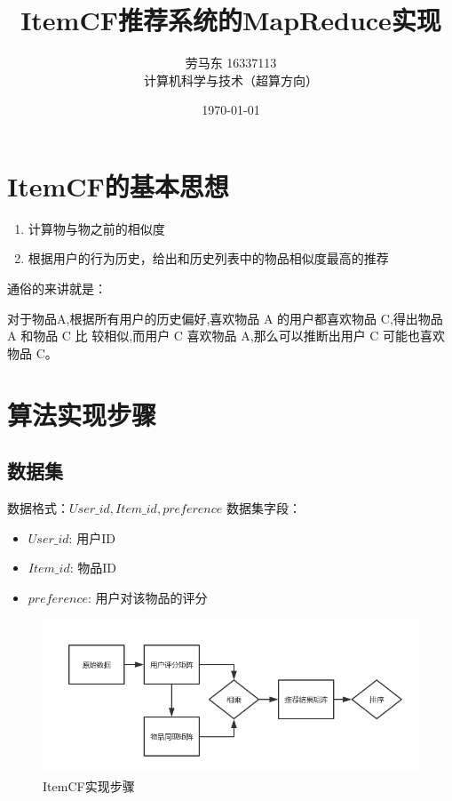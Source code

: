 \documentclass[12pt, a4paper]{article}
\title{ItemCF推荐系统的MapReduce实现}
\author{劳马东  16337113\\计算机科学与技术（超算方向）}
\date{\today}
\begin{document}
\maketitle
\rmfamily

\section{ItemCF的基本思想}
\begin{enumerate}
  \item 计算物与物之前的相似度
  \item 根据用户的行为历史，给出和历史列表中的物品相似度最高的推荐
\end{enumerate}
\par 通俗的来讲就是：
\ttfamily
\par 对于物品A,根据所有用户的历史偏好,喜欢物品 A 的用户都喜欢物品 C,得出物品 A 和物品 C 比
较相似,而用户 C 喜欢物品 A,那么可以推断出用户 C 可能也喜欢物品 C。
\rmfamily
\section{算法实现步骤}
\subsection{数据集}
数据格式：$User\_id,Item\_id,preference$
数据集字段：
\begin{itemize}
  \item $User\_id$: 用户ID
  \item $Item\_id$: 物品ID
  \item $preference$: 用户对该物品的评分
\end{itemize}
\begin{figure}[ht]
\centering
\includegraphics[scale=0.5]{steps.jpg}
\caption{ItemCF实现步骤}
\label{fig:label}
\end{figure}
\end{document}
